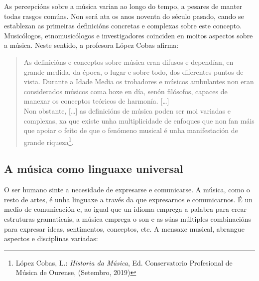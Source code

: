 \documentclass[a4paper, twoside]{templates/ociamthesis}
\begin{document}
As percepcións sobre a música varian ao longo do tempo, a pesares de manter todas rasgos comúns. Non será ata os anos noventa do século pasado, cando se establezan as primeiras definicións concretas e complexas sobre este concepto. Musicólogos, etnomusicólogos e investigadores coinciden en moitos aspectos sobre a música. Neste sentido, a profesora López Cobas afirma:

\begin{quote}
As definicións e conceptos sobre música eran difusos e dependían, en grande medida, da época, o lugar e sobre todo, dos diferentes puntos de vista. Durante a Idade Media os trobadores e músicos ambulantes non eran considerados músicos coma hoxe en día, senón filósofos, capaces de manexar os conceptos teóricos de harmonía. {[}\ldots{]}\\
Non obstante, {[}\ldots{]} as definicións de música poden ser moi variadas e complexas, xa que existe unha multiplicidade de enfoques que non fan máis que apoiar o feito de que o fenómeno musical é unha manifestación de grande riqueza\footnote{López Cobas, L.: \emph{Historia da Música}, Ed. Conservatorio Profesional de Música de Ourense, (Setembro, 2019)}.
\end{quote}

\hypertarget{a-muxfasica-como-linguaxe-universal}{%
\subsection*{A música como linguaxe universal}\label{a-muxfasica-como-linguaxe-universal}}

O ser humano sinte a necesidade de expresarse e comunicarse. A música, como o resto de artes, é unha linguaxe a través da que expresarnos e comunicarnos. É un medio de comunicación e, ao igual que un idioma emprega a palabra para crear estruturas gramaticais, a música emprega o son e as súas múltiples combinacións para expresar ideas, sentimentos, conceptos, etc. A mensaxe musical, abrangue aspectos e disciplinas variadas:
\end{document}
